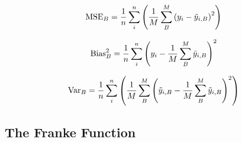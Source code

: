 \documentclass[reprint, english, nofootinbib]{revtex4-2}
\begin{document}
        \begin{equation}
        \label{bootstrap_mse}
        \textup{MSE}_{B} = \frac{1}{n} \sum^{n}_{i} \qty(\frac{1}{M}\sum^{M}_{B} \qty(y_{i} - \tilde{y}_{i,B})^2)
        \end{equation}

        \begin{equation}
        \label{bootstrap_bias}
        \textup{Bias}^2_{B} = \frac{1}{n} \sum^{n}_{i} \qty(y_{i} - \frac{1}{M}\sum^{M}_{B} \tilde{y}_{i,B})^2
        \end{equation}

        \begin{equation}
        \label{bootstrap_variance}
        \textup{Var}_{B} = \frac{1}{n} \sum^{n}_{i} \qty(\frac{1}{M}\sum^{M}_{B} \qty(\tilde{y}_{i,B} - \frac{1}{M}\sum^{M}_{B} \tilde{y}_{i,B})^2)
        \end{equation}

    \subsection{The Franke Function}
\end{document}
